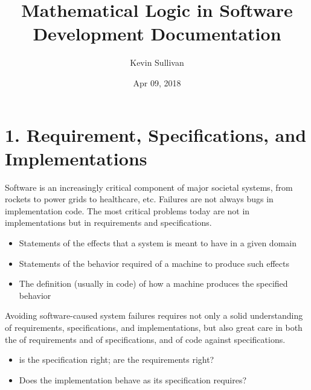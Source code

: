 \documentclass[letterpaper,10pt,english]{sphinxmanual}
\title{Mathematical Logic in Software Development Documentation}
\date{Apr 09, 2018}
\author{Kevin Sullivan}
\begin{document}
\maketitle
\sphinxtableofcontents
{}\label{\detokenize{index::doc}}



\chapter{1. Requirement, Specifications, and Implementations}
\label{\detokenize{01-reqs-specs-impls:welcome-to-mathematical-logic-in-software-development}}\label{\detokenize{01-reqs-specs-impls::doc}}\label{\detokenize{01-reqs-specs-impls:requirement-specifications-and-implementations}}
Software is an increasingly critical component of major societal
systems, from rockets to power grids to healthcare, etc. Failures are
not always bugs in implementation code. The most critical problems
today are not in implementations but in requirements and
specifications.
\begin{itemize}
\item {} 
 Statements of the effects that a system is meant to have in a given domain

\item {} 
 Statements of the behavior required of a machine to produce such effects

\item {} 
 The definition (usually in code) of how a machine produces the specified behavior

\end{itemize}

Avoiding software-caused system failures requires not only a solid
understanding of requirements, specifications, and implementations,
but also great care in both the  of requirements and of
specifications, and  of code against specifications.
\begin{itemize}
\item {} 
  is the specification right; are the requirements right?

\item {} 
  Does the implementation behave as its specification requires?

\end{itemize}
\end{document}
